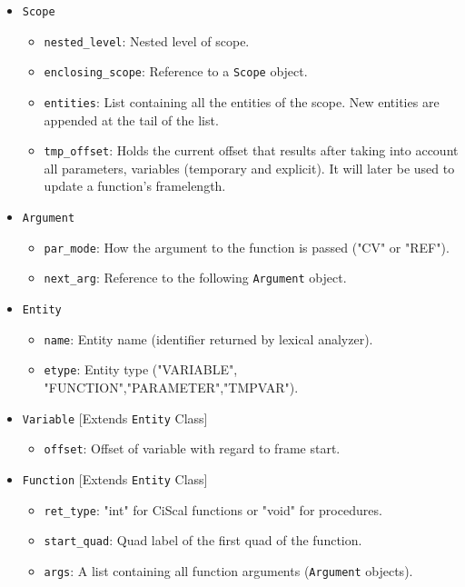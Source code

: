 \documentclass{article}
\def\code#1{\texttt{#1}} %
\begin{document}
\begin{itemize}
 \item \code{Scope}
    \begin{itemize}
    \item \code{nested\_level}: Nested level of scope.
    \item \code{enclosing\_scope}: Reference to a \code{Scope} object.
    \item \code{entities}: List containing all the entities of the scope. New entities
                           are appended at the tail of the list.
    \item \code{tmp\_offset}: Holds the current offset that results after taking into account all parameters,
                              variables (temporary and explicit). It will later be used to update a function's framelength.
    \end{itemize}
  \item \code{Argument}
    \begin{itemize}
    \item \code{par\_mode}: How the argument to the function is passed ("CV" or "REF").
    \item \code{next\_arg}: Reference to the following \code{Argument} object.
    \end{itemize}
  \item \code{Entity}
    \begin{itemize}
    \item \code{name}: Entity name (identifier returned by lexical analyzer).
    \item \code{etype}: Entity type ("VARIABLE", "FUNCTION","PARAMETER","TMPVAR").
    \end{itemize}
  \item \code{Variable} [Extends \code{Entity} Class]
    \begin{itemize}
    \item \code{offset}: Offset of variable with regard to frame start.
    \end{itemize}
  \item \code{Function} [Extends \code{Entity} Class]
    \begin{itemize}
    \item \code{ret\_type}: "int" for CiScal functions or "void" for procedures.
    \item \code{start\_quad}: Quad label of the first quad of the function.
    \item \code{args}: A list containing all function arguments (\code{Argument} objects).

\end{itemize}
\end{itemize}
\end{document}
